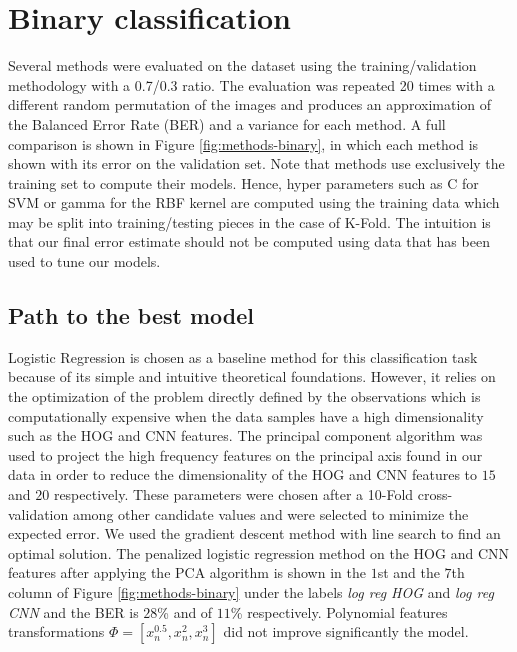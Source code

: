 \documentclass{article} %
\begin{document}
\section{Binary classification}
\label{sec:binary}
Several methods were evaluated on the dataset using the training/validation methodology with a 0.7/0.3 ratio. The evaluation was repeated 20 times with a different random permutation of the images and produces an approximation of the Balanced Error Rate (BER) and a variance for each method. A full comparison is shown in Figure \ref{fig:methods-binary}, in which each method is shown with its error on the validation set. Note that methods use exclusively the training set to compute their models. Hence, hyper parameters such as C for SVM or gamma for the RBF kernel are computed using the training data which may be split into training/testing pieces in the case of K-Fold. The intuition is that our final error estimate should not be computed using data that has been used to tune our models.

\subsection{Path to the best model}

Logistic Regression is chosen as a baseline method for this classification task because of its simple and intuitive theoretical foundations. However, it relies on the optimization of the problem directly defined by the observations which is computationally expensive when the data samples have a high dimensionality such as the HOG and CNN features. The principal component algorithm was used to project the high frequency features on the principal axis found in our data in order to reduce the dimensionality of the HOG and CNN features to $15$ and $20$ respectively. These parameters were chosen after a 10-Fold cross-validation among other candidate values and were selected to minimize the expected error. We used the gradient descent method with line search to find an optimal solution. The penalized logistic regression method on the HOG and CNN features after applying the PCA algorithm is shown in the {$1$}st and the {$7$}th column of Figure \ref{fig:methods-binary} under the labels \textit{log reg HOG} and \textit{log reg CNN} and the BER is $28$\% and of $11$\% respectively. Polynomial features transformations $\Phi = \left[ x_{n}^{0.5}, x_{n}^2, x_{n}^3 \right]$ did not improve significantly the model.
\end{document}
